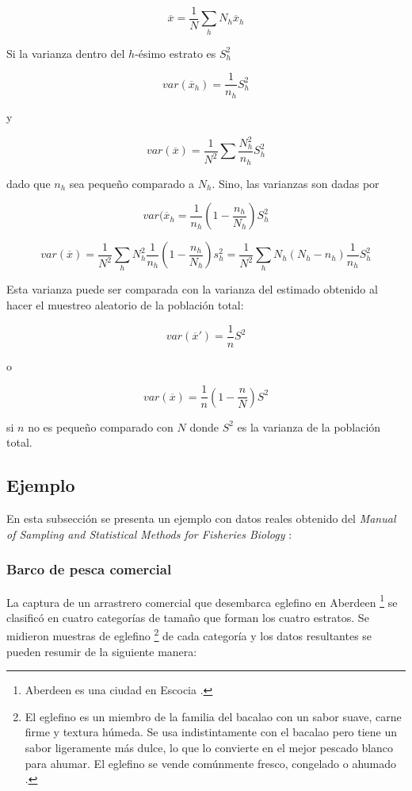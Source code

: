\documentclass{report}
\begin{document}
$$
\overline{x} = \frac{1}{N} \sum_{h} N_h \overline{x}_h
$$

Si la varianza dentro del $h$-ésimo estrato es $S_h^2$

$$
var(\overline{x}_h) = \frac{1}{n_h} S_h^2
$$

y

$$
var(\overline{x}) = \frac{1}{N^2} \sum \frac{N_h^2}{n_h}S_h^2
$$

dado que $n_h$ sea pequeño comparado a $N_h$. Sino, las varianzas son dadas por

$$
var(\overline{x}_h = \frac{1}{n_h}(1 - \frac{n_h}{N_h})S_h^2
$$


$$
var(\overline{x}) = \frac{1}{N^2} \sum_h N_h^2 \frac{1}{n_h}(1 - \frac{n_h}{N_h})s_h^2 = \frac{1}{N^2} \sum_h N_h (N_h - n_h) \frac{1}{n_h} S_h^2
$$

Esta varianza puede ser comparada con la varianza del estimado obtenido al hacer el muestreo aleatorio de la población total:

$$
var(\overline{x}') = \frac{1}{n}S^2
$$

o

$$
var(\overline{x}) = \frac{1}{n}(1 - \frac{n}{N})S^2
$$

si $n$ no es pequeño comparado con $N$ donde $S^2$ es la varianza de la población total.

\subsection{Ejemplo}

En esta subsección se presenta un ejemplo con datos reales obtenido del \textit{Manual of Sampling and Statistical Methods for Fisheries Biology} \cite{gulland-1966}:

\bigbreak

\subsubsection{Barco de pesca comercial}

La captura de un arrastrero comercial que desembarca eglefino en Aberdeen \footnote{Aberdeen es una ciudad en Escocia \cite{wikipedia-aberdeen-2021}.} se clasificó en cuatro categorías de tamaño que forman los cuatro estratos. Se midieron muestras de eglefino \footnote{El eglefino es un miembro de la familia del bacalao con un sabor suave, carne firme y textura húmeda. Se usa indistintamente con el bacalao pero tiene un sabor ligeramente más dulce, lo que lo convierte en el mejor pescado blanco para ahumar. El eglefino se vende comúnmente fresco, congelado o ahumado \cite{sustainable-fishing-msc-marine-stewardship-council-2021}.} de cada categoría y los datos resultantes se pueden resumir de la siguiente manera:
\end{document}
